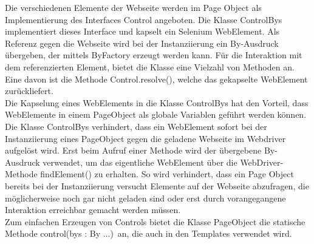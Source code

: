 Die verschiedenen Elemente der Webseite werden im Page Object als Implementierung des Interfaces Control angeboten.
Die Klasse ControlBys implementiert dieses Interface und kapselt ein Selenium WebElement. Als Referenz gegen die Webseite wird bei der Instanziierung ein By-Ausdruck übergeben, der mittels ByFactory erzeugt werden kann.
Für die Interaktion mit dem referenzierten Element, bietet die Klasse eine Vielzahl von Methoden an. Eine davon ist die Methode \grq Control.resolve()\grq, welche das gekapselte WebElement zurückliefert.\\
Die Kapselung eines WebElements in die Klasse ControlBys hat den Vorteil, dass WebElemente in einem PageObject als globale Variablen geführt werden können.
Die Klasse ControlBys verhindert, dass ein WebElement sofort bei der Instanziierung eines PageObject gegen die geladene Webseite im Webdriver aufgelöst wird. Erst beim Aufruf einer Methode wird der übergebene By-Ausdruck verwendet, um das eigentliche WebElement über die WebDriver-Methode findElement() zu erhalten.
So wird verhindert, dass ein Page Object bereits bei der Instanziierung versucht Elemente auf der Webseite abzufragen, die möglicherweise noch gar nicht geladen sind oder erst durch vorangegangene Interaktion erreichbar gemacht werden müssen.\\ Zum einfachen Erzeugen von Controls bietet die Klasse PageObject die statische Methode \grq control(bys : By ...)\grq\ an, die auch in den Templates verwendet wird.


